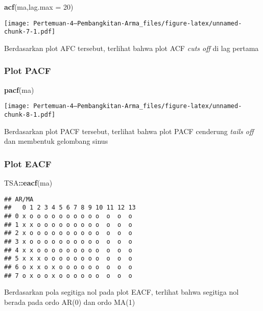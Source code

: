 \documentclass[
]{article}
\newenvironment{Shaded}{\begin{snugshade}}{\end{snugshade}}
\newcommand{\AttributeTok}[1]{\textcolor[rgb]{0.13,0.29,0.53}{#1}}
\newcommand{\DecValTok}[1]{\textcolor[rgb]{0.00,0.00,0.81}{#1}}
\newcommand{\FunctionTok}[1]{\textcolor[rgb]{0.13,0.29,0.53}{\textbf{#1}}}
\newcommand{\NormalTok}[1]{#1}
\newcommand{\SpecialCharTok}[1]{\textcolor[rgb]{0.81,0.36,0.00}{\textbf{#1}}}
\begin{document}
\begin{Shaded}
\begin{Highlighting}[]
\FunctionTok{acf}\NormalTok{(ma,}\AttributeTok{lag.max =} \DecValTok{20}\NormalTok{)}
\end{Highlighting}
\end{Shaded}

\texttt{[image: Pertemuan-4---Pembangkitan-Arma\_files/figure-latex/unnamed-chunk-7-1.pdf]}

Berdasarkan plot AFC tersebut, terlihat bahwa plot ACF \emph{cuts off}
di lag pertama

\subsubsection{Plot PACF}\label{plot-pacf}

\begin{Shaded}
\begin{Highlighting}[]
\FunctionTok{pacf}\NormalTok{(ma)}
\end{Highlighting}
\end{Shaded}

\texttt{[image: Pertemuan-4---Pembangkitan-Arma\_files/figure-latex/unnamed-chunk-8-1.pdf]}

Berdasarkan plot PACF tersebut, terlihat bahwa plot PACF cenderung
\emph{tails off} dan membentuk gelombang sinus

\subsubsection{Plot EACF}\label{plot-eacf}

\begin{Shaded}
\begin{Highlighting}[]
\NormalTok{TSA}\SpecialCharTok{::}\FunctionTok{eacf}\NormalTok{(ma)}
\end{Highlighting}
\end{Shaded}

\begin{verbatim}
## AR/MA
##   0 1 2 3 4 5 6 7 8 9 10 11 12 13
## 0 x o o o o o o o o o o  o  o  o 
## 1 x x o o o o o o o o o  o  o  o 
## 2 x o o o o o o o o o o  o  o  o 
## 3 x o o o o o o o o o o  o  o  o 
## 4 x x o o o o o o o o o  o  o  o 
## 5 x x x o o o o o o o o  o  o  o 
## 6 o x x o x o o o o o o  o  o  o 
## 7 o x o o x o o o o o o  o  o  o
\end{verbatim}

Berdasarkan pola segitiga nol pada plot EACF, terlihat bahwa segitiga
nol berada pada ordo AR(0) dan ordo MA(1)
\end{document}
